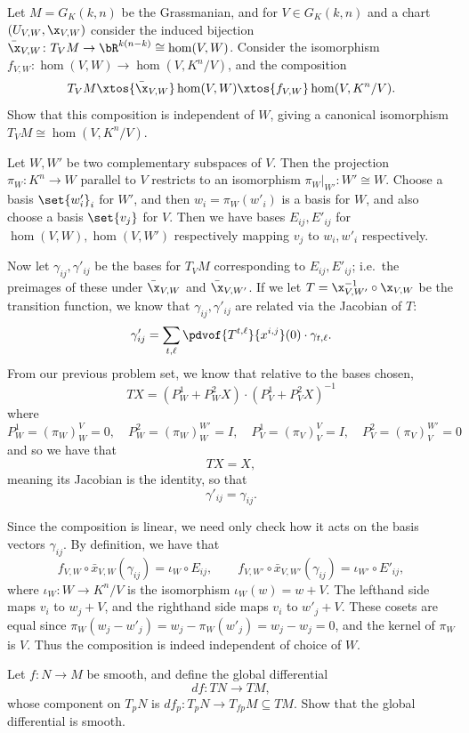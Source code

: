 \bprob

    Let $M=G_K(k,n)$ be the Grassmanian, and for $V\in G_K(k,n)$ and a chart $(U_{V,W},\x_{V,W})$ consider the induced
    bijection $\bar\x_{V,W}\colon T_VM\to\bR^{k(n-k)}\cong\hom(V,W)$.
    Consider the isomorphism $f_{V,W}\colon\hom(V,W)\to\hom(V,K^n/V)$, and the composition
    $$ T_VM \xtos{\bar\x_{V,W}} \hom(V,W) \xtos{f_{V,W}} \hom(V,K^n/V) . $$
    Show that this composition is independent of $W$, giving a canonical isomorphism $T_VM\cong\hom(V,K^n/V)$.

\eprob

Let $W,W'$ be two complementary subspaces of $V$.
Then the projection $\pi_W\colon K^n\to W$ parallel to $V$ restricts to an isomorphism $\pi_W|_{W'}\colon W'\cong W$.
Choose a basis $\set{w'_i}_i$ for $W'$, and then $w_i=\pi_W(w'_i)$ is a basis for $W$, and also choose a basis
$\set{v_j}$ for $V$.
Then we have bases $E_{ij},E'_{ij}$ for $\hom(V,W),\hom(V,W')$ respectively mapping $v_j$ to $w_i,w'_i$ respectively.

Now let $\gamma_{ij},\gamma'_{ij}$ be the bases for $T_VM$ corresponding to $E_{ij},E'_{ij}$; i.e.\ the preimages
of these under $\bar\x_{V,W}$ and $\bar\x_{V,W'}$.
If we let $T=\x^{-1}_{V,W'}\circ\x_{V,W}$ be the transition function, we know that $\gamma_{ij},\gamma'_{ij}$ are
related via the Jacobian of $T$:
$$ \gamma'_{ij} = \sum_{t,\ell} \pdvof{T^{t,\ell}}{x^{i,j}}(0)\cdot\gamma_{t,\ell} . $$
From our previous problem set, we know that relative to the bases chosen,
$$ TX = (P^1_W + P^2_WX)\cdot(P^1_V + P^2_VX)^{-1} $$
where
$$ P^1_W = (\pi_W)^V_W = 0,\quad P^2_W = (\pi_W)^{W'}_W = I,\quad P^1_V = (\pi_V)^V_V = I,\quad P^2_V = (\pi_V)^{W'}_V = 0
$$
and so we have that
$$ TX = X , $$
meaning its Jacobian is the identity, so that
$$ \gamma'_{ij} = \gamma_{ij} . $$

Since the composition is linear, we need only check how it acts on the basis vectors $\gamma_{ij}$.
By definition, we have that
$$ f_{V,W}\circ\bar x_{V,W}(\gamma_{ij}) = \iota_W\circ E_{ij},\qquad f_{V,W'}\circ\bar x_{V,W'}(\gamma_{ij}) =
\iota_{W'}\circ E'_{ij} , $$
where $\iota_W\colon W\to K^n/V$ is the isomorphism $\iota_W(w)=w+V$.
The lefthand side maps $v_i$ to $w_j+V$, and the righthand side maps $v_i$ to $w'_j+V$.
These cosets are equal since $\pi_W(w_j-w'_j)=w_j-\pi_W(w'_j)=w_j-w_j=0$, and the kernel of $\pi_W$ is $V$.
Thus the composition is indeed independent of choice of $W$.

\bprob

    Let $f\colon N\to M$ be smooth, and define the {\emphcolor global differential}
    $$ df\colon TN\to TM , $$
    whose component on $T_pN$ is $df_p\colon T_pN\to T_{fp}M\subseteq TM$.
    Show that the global differential is smooth.

